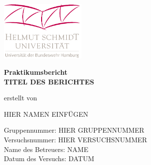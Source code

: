 \thispagestyle{empty}

\begin{center}
\includegraphics[height=3.0cm]{Bilder/Deckblatt/HSU_Logo.png}   
\end{center}

\begin{center}

\vspace*{0.50cm}

\Large
\textbf{Praktikumsbericht}\\
 
\vspace*{1cm}
\huge
\textbf{TITEL DES BERICHTES}
 	
\vspace*{1.0cm}

\large
erstellt von\\

\vspace*{0.5cm}

\Large
HIER NAMEN EINFÜGEN \\

\vspace*{2cm}

\end{center}

\large
Gruppennummer: HIER GRUPPENNUMMER\\

\large 
\noindent
Versuchsnummer: HIER VERSUCHSNUMMER\\

\large
Name des Betreuers: NAME\\

\large
Datum des Versuchs: DATUM\\
 

	

